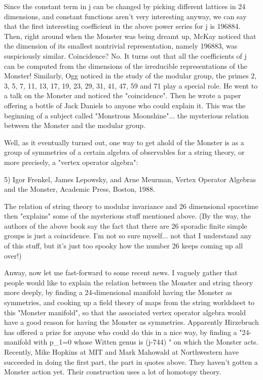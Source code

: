Since the constant term in j can be changed by picking different
lattices in 24 dimensions, and constant functions aren't very
interesting anyway, we can say that the first interesting coefficient in
the above power series for j is 196884.  Then, right around when the
Monster was being dreamt up,  McKay noticed that the dimension of its
smallest nontrivial representation, namely 196883, was suspiciously
similar.  Coincidence?  No.  It turns out that all the coefficients of j
can be computed from the dimensions of the irreducible representations
of the Monster!  Similarly, Ogg noticed in the study of the modular
group, the primes 2, 3, 5, 7, 11, 13, 17, 19, 23, 29, 31, 41, 47, 59 and 71 play a
special role.  He went to a talk on the Monster and noticed the
"coincidence".  Then he wrote a paper offering a bottle of Jack Daniels
to anyone who could explain it.  This was the beginning of a subject
called "Monstrous Moonshine"... the mysterious relation between the
Monster and the modular group.

Well, as it eventually turned out, one way to get ahold of the Monster
is as a group of symmetries of a certain algebra of observables for a
string theory, or more precisely, a "vertex operator algebra":

5) Igor Frenkel, James Lepowsky, and Arne Meurman, Vertex Operator
Algebras and the Monster, Academic Press, Boston, 1988. 

The relation of string theory to modular invariance and 26 dimensional
spacetime then "explains" some of the mysterious stuff mentioned above.
(By the way, the authors of the above book say the fact that there are
26 sporadic finite simple groups is just a coincidence.  I'm not so sure
myself... not that I understand any of this stuff, but it's just too
spooky how the number 26 keeps coming up all over!)  

Anway, now let me fast-forward to some recent news.  I vaguely gather
that people would like to explain the relation between the Monster and
string theory more deeply, by finding a 24-dimensional manifold having
the Monster as symmetries, and cooking up a field theory of maps from
the string worldsheet to this "Monster manifold", so that the associated
vertex operator algebra would have a good reason for having the Monster
as symmetries.  Apparently Hirzebruch has offered a prize for anyone
who could do this in a nice way, by finding a "24-manifold with p_{1}=0 
whose
Witten genus is (j-744) \Delta " on which the Monster acts.  Recently, 
Mike Hopkins at MIT and Mark Mahowald at Northwestern have succeeded in
doing the first part, the part in quotes above.  They haven't gotten a
Monster action yet.  Their construction uses a lot of homotopy theory.


